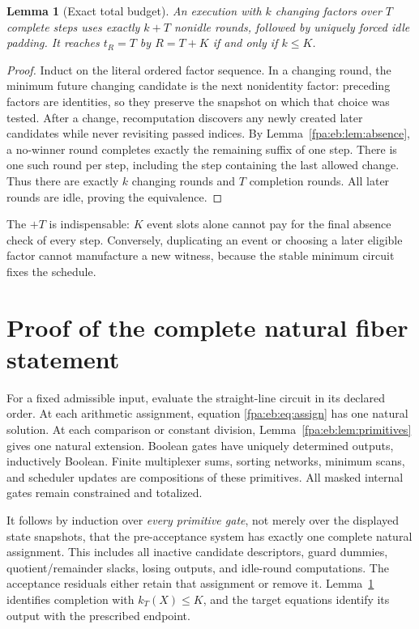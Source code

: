 \documentclass[11pt,a4paper]{article}
\numberwithin{equation}{section}
\newtheorem{lemma}[theorem]{Lemma}
\begin{document}
\begin{lemma}[Exact total budget]\label{fpa:eb:lem:budget}
An execution with $k$ changing factors over $T$ complete steps uses exactly $k+T$ nonidle rounds, followed by uniquely forced idle padding. It reaches $t_R=T$ by $R=T+K$ if and only if $k\leq K$.
\end{lemma}
\begin{proof}
Induct on the literal ordered factor sequence. In a changing round, the minimum future changing candidate is the next nonidentity factor: preceding factors are identities, so they preserve the snapshot on which that choice was tested. After a change, recomputation discovers any newly created later candidates while never revisiting passed indices. By Lemma~\ref{fpa:eb:lem:absence}, a no-winner round completes exactly the remaining suffix of one step. There is one such round per step, including the step containing the last allowed change. Thus there are exactly $k$ changing rounds and $T$ completion rounds. All later rounds are idle, proving the equivalence.
\end{proof}

The $+T$ is indispensable: $K$ event slots alone cannot pay for the final absence check of every step. Conversely, duplicating an event or choosing a later eligible factor cannot manufacture a new witness, because the stable minimum circuit fixes the schedule.

\section{Proof of the complete natural fiber statement}\label{fpa:eb:sec:proof}
For a fixed admissible input, evaluate the straight-line circuit in its declared order. At each arithmetic assignment, equation \eqref{fpa:eb:eq:assign} has one natural solution. At each comparison or constant division, Lemma~\ref{fpa:eb:lem:primitives} gives one natural extension. Boolean gates have uniquely determined outputs, inductively Boolean. Finite multiplexer sums, sorting networks, minimum scans, and scheduler updates are compositions of these primitives. All masked internal gates remain constrained and totalized.

It follows by induction over \emph{every primitive gate}, not merely over the displayed state snapshots, that the pre-acceptance system has exactly one complete natural assignment. This includes all inactive candidate descriptors, guard dummies, quotient/remainder slacks, losing outputs, and idle-round computations. The acceptance residuals either retain that assignment or remove it. Lemma~\ref{fpa:eb:lem:budget} identifies completion with $k_T(X)\leq K$, and the target equations identify its output with the prescribed endpoint.
\end{document}
